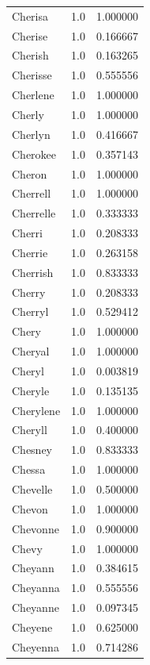 \documentclass[
  letterpaper,
  DIV=11,
  numbers=noendperiod]{scrreprt}
\begin{document}
\begin{tabular}{lrr}
Cherisa         &   1.0 &   1.000000 \\
Cherise         &   1.0 &   0.166667 \\
Cherish         &   1.0 &   0.163265 \\
Cherisse        &   1.0 &   0.555556 \\
Cherlene        &   1.0 &   1.000000 \\
Cherly          &   1.0 &   1.000000 \\
Cherlyn         &   1.0 &   0.416667 \\
Cherokee        &   1.0 &   0.357143 \\
Cheron          &   1.0 &   1.000000 \\
Cherrell        &   1.0 &   1.000000 \\
Cherrelle       &   1.0 &   0.333333 \\
Cherri          &   1.0 &   0.208333 \\
Cherrie         &   1.0 &   0.263158 \\
Cherrish        &   1.0 &   0.833333 \\
Cherry          &   1.0 &   0.208333 \\
Cherryl         &   1.0 &   0.529412 \\
Chery           &   1.0 &   1.000000 \\
Cheryal         &   1.0 &   1.000000 \\
Cheryl          &   1.0 &   0.003819 \\
Cheryle         &   1.0 &   0.135135 \\
Cherylene       &   1.0 &   1.000000 \\
Cheryll         &   1.0 &   0.400000 \\
Chesney         &   1.0 &   0.833333 \\
Chessa          &   1.0 &   1.000000 \\
Chevelle        &   1.0 &   0.500000 \\
Chevon          &   1.0 &   1.000000 \\
Chevonne        &   1.0 &   0.900000 \\
Chevy           &   1.0 &   1.000000 \\
Cheyann         &   1.0 &   0.384615 \\
Cheyanna        &   1.0 &   0.555556 \\
Cheyanne        &   1.0 &   0.097345 \\
Cheyene         &   1.0 &   0.625000 \\
Cheyenna        &   1.0 &   0.714286 \\

\end{tabular}
\end{document}
